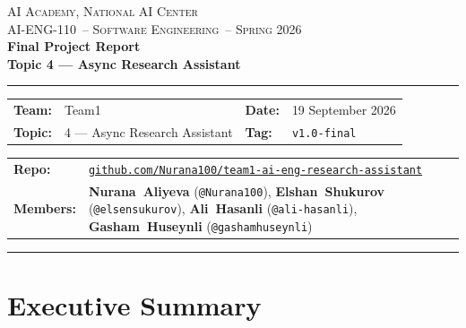 \documentclass[11pt,a4paper]{article}
\newcommand{\teamname}{Team1}
\newcommand{\topicchoice}{Topic 4 --- Async Research Assistant}
\newcommand{\member}[2]{\textbf{#1} (\texttt{#2})}
\newcommand{\reportdate}{19 September 2026}
\newcommand{\repolink}{\href{https://github.com/Nurana100/team1-ai-eng-research-assistant}%
{\texttt{github.com/Nurana100/\allowbreak team1-ai-eng-research-assistant}}}
\newcommand{\coursecode}{AI-ENG-110}
\newcommand{\coursename}{Software Engineering}
\newcommand{\institution}{AI Academy, National AI Center}
\newcommand{\semester}{Spring 2026}
\begin{document}
\begin{center}
{\small \textsc{\institution} \\[0.2em] \textsc{\coursecode\ -- \coursename\ -- \semester}}\\[1.2em]
{\Large\bfseries\color{accent} Final Project Report}\\[0.3em]
{\LARGE\bfseries \topicchoice}\\[0.6em]
\rule{0.85\textwidth}{0.6pt}
\end{center}

\vspace{0.4em}
\noindent
\begin{tabular}{@{}llll@{}}
\textbf{Team:} & \teamname\hspace{2.2cm} & \textbf{Date:} & \reportdate \\
\textbf{Topic:} & 4 --- Async Research Assistant\hspace{0.6cm} & \textbf{Tag:} & \texttt{v1.0-final} \\
\end{tabular}

\begin{tabularx}{\textwidth}{@{}l>{\RaggedRight}X@{}}
\textbf{Repo:} & \repolink \\
\textbf{Members:} &
  \member{Nurana~Aliyeva}{@Nurana100},\quad
  \member{Elshan~Shukurov}{@elsensukurov},\quad
  \member{Ali~Hasanli}{@ali-hasanli},\quad
  \member{Gasham~Huseynli}{@gashamhuseynli}
\end{tabularx}
\vspace{0.4em}\hrule\vspace{0.6em}

\section*{Executive Summary}
\end{document}
